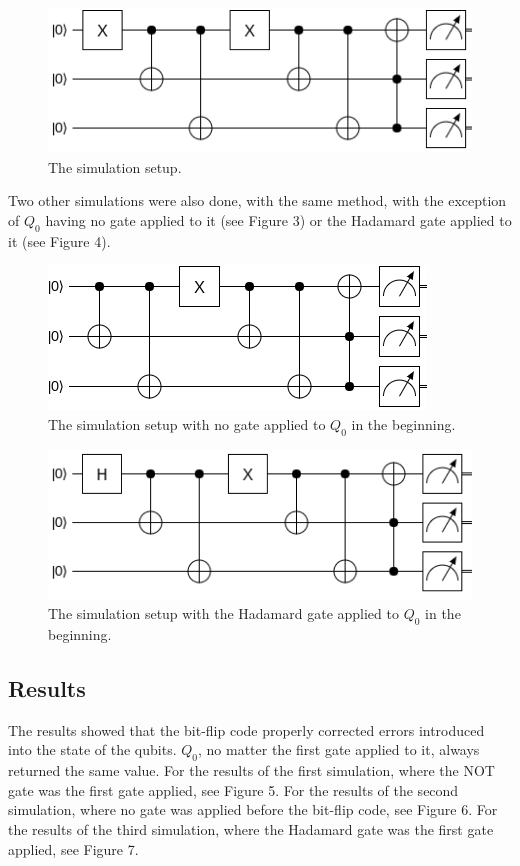 \documentclass{article}
\begin{document}
\begin{figure}[H]
    \centering
    \includegraphics[scale=0.6]{bitflipsimulation.png}
    \caption{The simulation setup.}
    \label{fig:bitflipsimulation}
\end{figure}

Two other simulations were also done, with the same method, with the exception of $Q_0$ having no gate applied to it (see Figure 3) or the Hadamard gate applied to it (see Figure 4).

\begin{figure}[H]
    \centering
    \includegraphics[scale=0.6]{bitflipsimulation2.png}
    \caption{The simulation setup with no gate applied to $Q_0$ in the beginning.}
    \label{fig:bitflipsimulation2}
\end{figure}

\begin{figure}[H]
    \centering
    \includegraphics[scale=0.6]{bitflipsimulation3.png}
    \caption{The simulation setup with the Hadamard gate applied to $Q_0$ in the beginning.}
    \label{fig:bitflipsimulation3}
\end{figure}

\subsection{Results}
The results showed that the bit-flip code properly corrected errors introduced into the state of the qubits. $Q_0$, no matter the first gate applied to it, always returned the same value. For the results of the first simulation, where the NOT gate was the first gate applied, see Figure 5. For the results of the second simulation, where no gate was applied before the bit-flip code, see Figure 6. For the results of the third simulation, where the Hadamard gate was the first gate applied, see Figure 7.
\end{document}
